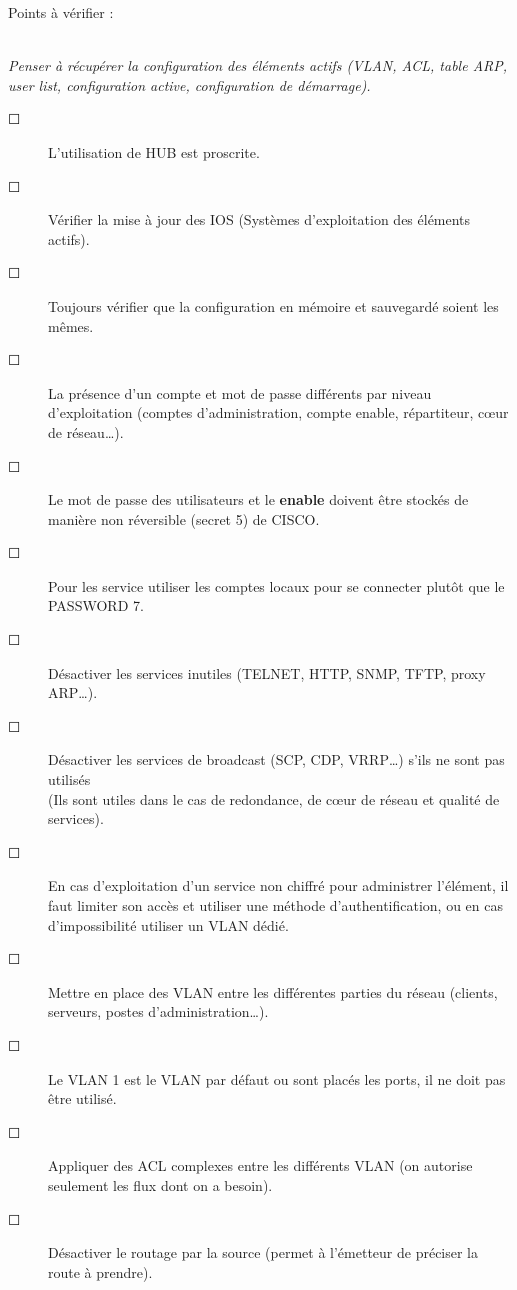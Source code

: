 \documentclass[a4paper,11pt]{article}				    %
\begin{document}
{\begin{LARGE}Points \`a v\'erifier : \end{LARGE}\\
\textit{\small Penser \`a r\'ecup\'erer la configuration des \'el\'ements actifs (VLAN, ACL, table ARP, user list, configuration active, configuration de d\'emarrage).}
\begin{description}
    \item[$\Square$] L'utilisation de HUB est proscrite.
    \item[$\Square$] V\'erifier la mise \`a jour des IOS (Syst\`emes d'exploitation des \'el\'ements actifs).
    \item[$\Square$] Toujours v\'erifier que la configuration en m\'emoire et sauvegard\'e soient les m\^emes.
    \item[$\Square$] La pr\'esence d'un compte et mot de passe diff\'erents par niveau d'exploitation (comptes d'administration, compte enable, r\'epartiteur, c\oe ur de r\'eseau\dots{}).
    \item[$\Square$] Le mot de passe des utilisateurs et le \textbf{enable} doivent \^etre stock\'es de mani\`ere non r\'eversible (secret 5) de CISCO.
    \item[$\Square$] Pour les service utiliser les comptes locaux pour se connecter plut\^ot que le PASSWORD 7.
    \item[$\Square$] D\'esactiver les services inutiles (TELNET, HTTP, SNMP, TFTP, proxy ARP\dots{}).
    \item[$\Square$] D\'esactiver les services de broadcast (SCP, CDP, VRRP\dots{}) s'ils ne sont pas utilis\'es\\ (Ils sont utiles dans le cas de redondance, de c\oe ur de r\'eseau et qualit\'e de services).
    \item[$\Square$] En cas d'exploitation d'un service non chiffr\'e pour administrer l'\'el\'ement, il faut limiter son acc\`es et utiliser une m\'ethode d'authentification, ou en cas d'impossibilit\'e utiliser un VLAN d\'edi\'e.
    \item[$\Square$] Mettre en place des VLAN entre les diff\'erentes parties du r\'eseau (clients, serveurs, postes d'administration\dots{}).
    \item[$\Square$] Le VLAN 1 est le VLAN par d\'efaut ou sont plac\'es les ports, il ne doit pas \^etre utilis\'e.
    \item[$\Square$] Appliquer des ACL complexes entre les diff\'erents VLAN (on autorise seulement les flux dont on a besoin). 
    \item[$\Square$] D\'esactiver le routage par la source (permet \`a l'\'emetteur de pr\'eciser la route \`a prendre).

\end{description}}
\end{document}
